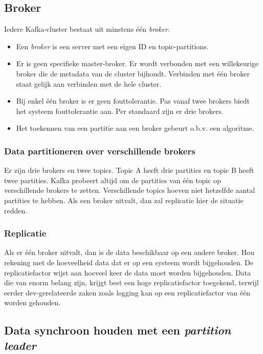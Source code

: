 \documentclass[a4paper,10pt,twoside]{report}
\begin{document}
\subsection{Broker}

Iedere Kafka-cluster bestaat uit minstens één \textit{broker}.  

\begin{itemize}
	\item Een \textit{broker} is een server met een eigen ID en topic-partitions.
	\item Er is geen specifieke master-broker. Er wordt verbonden met een willekeurige broker die de metadata van de cluster bijhoudt. Verbinden met één broker staat gelijk aan verbinden met de hele cluster.
	\item Bij enkel één broker is er geen fouttolerantie. Pas vanaf twee brokers biedt het systeem fouttolerantie aan. Per standaard zijn er drie brokers.
	\item Het toekennen van een partitie aan een broker gebeurt o.b.v. een algoritme.
\end{itemize}

\subsubsection{Data partitioneren over verschillende brokers}

Er zijn drie brokers en twee topics. Topic A heeft drie partities en topic B heeft twee partities. Kafka probeert altijd om de partities van één topic op verschillende brokers te zetten. Verschillende topics hoeven niet hetzelfde aantal partities te hebben. Als een broker uitvalt, dan zal replicatie hier de situatie redden. 

\subsubsection{Replicatie}

Als er één broker uitvalt, dan is de data beschikbaar op een andere broker. Hou rekening met de hoeveelheid data dat er op een systeem wordt bijgehouden. De replicatiefactor wijst aan hoeveel keer de data moet worden bijgehouden. Data die van enorm belang zijn, krijgt best een hoge replicatiefactor toegekend, terwijl eerder dev-gerelateerde zaken zoals logging kan op een replicatiefactor van één worden gehouden.

\subsection{Data synchroon houden met een \textit{partition leader}}
\end{document}
